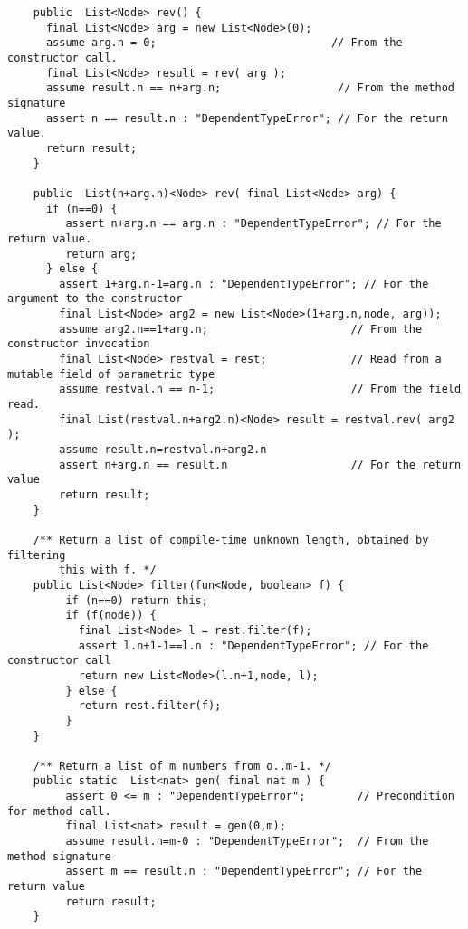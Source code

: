 \documentclass[nocopyrightspace,preprint,9pt]{sigplanconf}
\begin{document}
\begin{figure*}
{\footnotesize
\begin{verbatim}
    public  List<Node> rev() {
      final List<Node> arg = new List<Node>(0);
      assume arg.n = 0;                           // From the constructor call.
      final List<Node> result = rev( arg );
      assume result.n == n+arg.n;                  // From the method signature
      assert n == result.n : "DependentTypeError"; // For the return value.
      return result;
    }

    public  List(n+arg.n)<Node> rev( final List<Node> arg) {
      if (n==0) {
         assert n+arg.n == arg.n : "DependentTypeError"; // For the return value.
         return arg;
      } else {
        assert 1+arg.n-1=arg.n : "DependentTypeError"; // For the argument to the constructor
        final List<Node> arg2 = new List<Node>(1+arg.n,node, arg));
        assume arg2.n==1+arg.n;                      // From the constructor invocation
        final List<Node> restval = rest;             // Read from a mutable field of parametric type
        assume restval.n == n-1;                     // From the field read.
        final List(restval.n+arg2.n)<Node> result = restval.rev( arg2 );
        assume result.n=restval.n+arg2.n
        assert n+arg.n == result.n                   // For the return value
        return result;
    }

    /** Return a list of compile-time unknown length, obtained by filtering
        this with f. */
    public List<Node> filter(fun<Node, boolean> f) {
         if (n==0) return this;
         if (f(node)) {
           final List<Node> l = rest.filter(f);
           assert l.n+1-1==l.n : "DependentTypeError"; // For the constructor call
           return new List<Node>(l.n+1,node, l);
         } else {
           return rest.filter(f);
         }
    }

    /** Return a list of m numbers from o..m-1. */
    public static  List<nat> gen( final nat m ) {
         assert 0 <= m : "DependentTypeError";        // Precondition for method call.
         final List<nat> result = gen(0,m);
         assume result.n=m-0 : "DependentTypeError";  // From the method signature
         assert m == result.n : "DependentTypeError"; // For the return value
         return result;
    }


\end{verbatim}}
\end{figure*}
\end{document}
